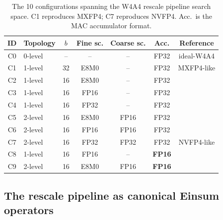 \documentclass[conference]{IEEEtran}
\begin{document}
\begin{table}[t]
\centering
\caption{The 10 configurations spanning the W4A4 rescale pipeline
search space.  C1 reproduces MXFP4; C7 reproduces NVFP4.  Acc.\ is
the MAC accumulator format.}
\label{tab:configs}
\small
\begin{tabular}{@{}clccccc@{}}
\toprule
ID & Topology & $b$ & Fine sc. & Coarse sc. & Acc. & Reference \\
\midrule
C0 & 0-level   & --  & --   & --   & FP32 & ideal-W4A4 \\
C1 & 1-level   & 32  & E8M0 & --   & FP32 & MXFP4-like \\
C2 & 1-level   & 16  & E8M0 & --   & FP32 &  \\
C3 & 1-level   & 16  & FP16 & --   & FP32 &  \\
C4 & 1-level   & 16  & FP32 & --   & FP32 &  \\
C5 & 2-level   & 16  & E8M0 & FP16 & FP32 &  \\
C6 & 2-level   & 16  & FP16 & FP16 & FP32 &  \\
C7 & 2-level   & 16  & FP32 & FP32 & FP32 & NVFP4-like \\
C8 & 1-level   & 16  & FP16 & --   & \textbf{FP16} &  \\
C9 & 2-level   & 16  & E8M0 & FP16 & \textbf{FP16} &  \\
\bottomrule
\end{tabular}
\end{table}

\subsection{The rescale pipeline as canonical Einsum operators}
\label{sec:einsum}
\end{document}

